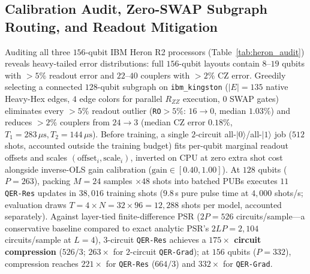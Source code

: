 \documentclass[11pt]{article}
\begin{document}
\subsection{Calibration Audit, Zero-SWAP Subgraph Routing, and Readout Mitigation}
\label{sec:heron_cal}
Auditing all three $156$-qubit IBM Heron R2 processors (Table~\ref{tab:heron_audit}) reveals heavy-tailed error distributions: full $156$-qubit layouts contain $8$--$19$ qubits with $>5\%$ readout error and $22$--$40$ couplers with $>2\%$ CZ error. Greedily selecting a connected $128$-qubit subgraph on \texttt{ibm\_kingston} ($|E|{=}135$ native Heavy-Hex edges, $4$ edge colors for parallel $R_{ZZ}$ execution, $0$ SWAP gates) eliminates every $>5\%$ readout outlier (\texttt{RO}$>5\%$: $16{\to}0$, median $1.03\%$) and reduces $>2\%$ couplers from $24{\to}3$ (median CZ error $0.18\%$, $T_1{=}283\,\mu\text{s}, T_2{=}144\,\mu\text{s}$). Before training, a single $2$-circuit all-$|0\rangle$/all-$|1\rangle$ job ($512$ shots, accounted outside the training budget) fits per-qubit marginal readout offsets and scales $(\text{offset}_i, \text{scale}_i)$, inverted on CPU at zero extra shot cost alongside inverse-OLS gain calibration ($\text{gain}\in[0.40,1.00]$). At $128$ qubits ($P{=}263$), packing $M{=}24$ samples $\times 48$ shots into batched PUBs executes $11$ \texttt{QER-Res} updates in $38{,}016$ training shots ($9.8\,$s pure pulse time at $4{,}000$ shots/s; evaluation draws $T{=}4{\times}N{=}32{\times}96{=}12{,}288$ shots per model, accounted separately). Against layer-tied finite-difference PSR ($2P{=}526$ circuits/sample—a conservative baseline compared to exact analytic PSR's $2LP{=}2{,}104$ circuits/sample at $L{=}4$), $3$-circuit \texttt{QER-Res} achieves a \textbf{$175\times$ circuit compression} ($526/3$; \textbf{$263\times$} for $2$-circuit \texttt{QER-Grad}); at $156$ qubits ($P{=}332$), compression reaches \textbf{$221\times$} for \texttt{QER-Res} ($664/3$) and \textbf{$332\times$} for \texttt{QER-Grad}.
\end{document}
